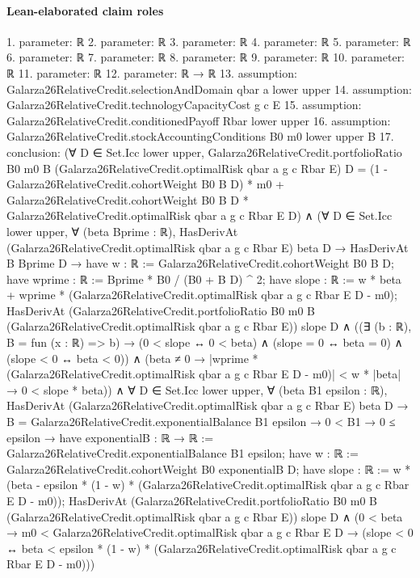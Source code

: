 \documentclass[10pt]{article}
\begin{document}
\paragraph{Lean-elaborated claim roles}\begin{ReviewVerbatim}
1. parameter: ℝ
2. parameter: ℝ
3. parameter: ℝ
4. parameter: ℝ
5. parameter: ℝ
6. parameter: ℝ
7. parameter: ℝ
8. parameter: ℝ
9. parameter: ℝ
10. parameter: ℝ
11. parameter: ℝ
12. parameter: ℝ → ℝ
13. assumption: Galarza26RelativeCredit.selectionAndDomain qbar a lower upper
14. assumption: Galarza26RelativeCredit.technologyCapacityCost g c E
15. assumption: Galarza26RelativeCredit.conditionedPayoff Rbar lower upper
16. assumption: Galarza26RelativeCredit.stockAccountingConditions B0 m0 lower upper B
17. conclusion: (∀ D ∈ Set.Icc lower upper,
    Galarza26RelativeCredit.portfolioRatio B0 m0 B (Galarza26RelativeCredit.optimalRisk qbar a g c Rbar E) D =
      (1 - Galarza26RelativeCredit.cohortWeight B0 B D) * m0 +
        Galarza26RelativeCredit.cohortWeight B0 B D * Galarza26RelativeCredit.optimalRisk qbar a g c Rbar E D) ∧
  (∀ D ∈ Set.Icc lower upper,
      ∀ (beta Bprime : ℝ),
        HasDerivAt (Galarza26RelativeCredit.optimalRisk qbar a g c Rbar E) beta D →
          HasDerivAt B Bprime D →
            have w : ℝ := Galarza26RelativeCredit.cohortWeight B0 B D;
            have wprime : ℝ := Bprime * B0 / (B0 + B D) ^ 2;
            have slope : ℝ := w * beta + wprime * (Galarza26RelativeCredit.optimalRisk qbar a g c Rbar E D - m0);
            HasDerivAt
                (Galarza26RelativeCredit.portfolioRatio B0 m0 B (Galarza26RelativeCredit.optimalRisk qbar a g c Rbar E))
                slope D ∧
              ((∃ (b : ℝ), B = fun (x : ℝ) => b) →
                  (0 < slope ↔ 0 < beta) ∧ (slope = 0 ↔ beta = 0) ∧ (slope < 0 ↔ beta < 0)) ∧
                (beta ≠ 0 →
                  |wprime * (Galarza26RelativeCredit.optimalRisk qbar a g c Rbar E D - m0)| < w * |beta| →
                    0 < slope * beta)) ∧
    ∀ D ∈ Set.Icc lower upper,
      ∀ (beta B1 epsilon : ℝ),
        HasDerivAt (Galarza26RelativeCredit.optimalRisk qbar a g c Rbar E) beta D →
          B = Galarza26RelativeCredit.exponentialBalance B1 epsilon →
            0 < B1 →
              0 ≤ epsilon →
                have exponentialB : ℝ → ℝ := Galarza26RelativeCredit.exponentialBalance B1 epsilon;
                have w : ℝ := Galarza26RelativeCredit.cohortWeight B0 exponentialB D;
                have slope : ℝ :=
                  w * (beta - epsilon * (1 - w) * (Galarza26RelativeCredit.optimalRisk qbar a g c Rbar E D - m0));
                HasDerivAt
                    (Galarza26RelativeCredit.portfolioRatio B0 m0 B
                      (Galarza26RelativeCredit.optimalRisk qbar a g c Rbar E))
                    slope D ∧
                  (0 < beta →
                    m0 < Galarza26RelativeCredit.optimalRisk qbar a g c Rbar E D →
                      (slope < 0 ↔
                        beta < epsilon * (1 - w) * (Galarza26RelativeCredit.optimalRisk qbar a g c Rbar E D - m0)))
\end{ReviewVerbatim}
\end{document}
